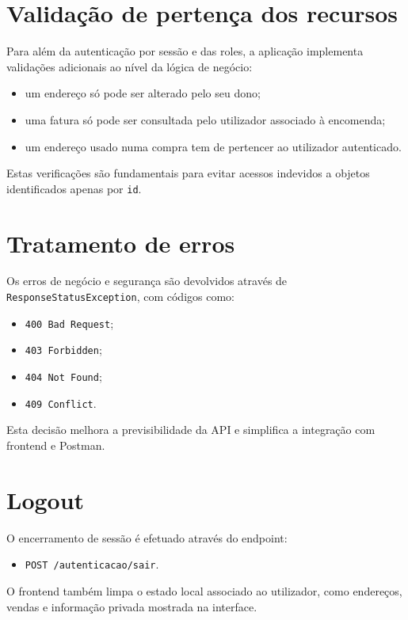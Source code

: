 \documentclass[10pt,a4paper]{report}
\begin{document}
\section{Validação de pertença dos recursos}

Para além da autenticação por sessão e das roles, a aplicação implementa validações adicionais ao nível da lógica de negócio:

\begin{itemize}
    \item um endereço só pode ser alterado pelo seu dono;
    \item uma fatura só pode ser consultada pelo utilizador associado à encomenda;
    \item um endereço usado numa compra tem de pertencer ao utilizador autenticado.
\end{itemize}

Estas verificações são fundamentais para evitar acessos indevidos a objetos identificados apenas por \texttt{id}.

\section{Tratamento de erros}

Os erros de negócio e segurança são devolvidos através de \texttt{ResponseStatusException}, com códigos como:

\begin{itemize}
    \item \texttt{400 Bad Request};
    \item \texttt{403 Forbidden};
    \item \texttt{404 Not Found};
    \item \texttt{409 Conflict}.
\end{itemize}

Esta decisão melhora a previsibilidade da \ac{API} e simplifica a integração com frontend e Postman.

\section{Logout}

O encerramento de sessão é efetuado através do endpoint:

\begin{itemize}
    \item \texttt{POST /autenticacao/sair}.
\end{itemize}

O frontend também limpa o estado local associado ao utilizador, como endereços, vendas e informação privada mostrada na interface.
\end{document}
